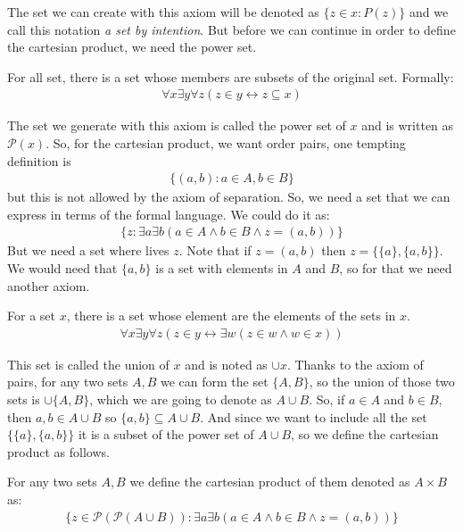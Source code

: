 \documentclass{tufte-handout}
\begin{document}
The set we can create with this axiom will be denoted as $\{z \in x: P(z)\}$ and we call this notation \textit{a set by intention}. But before we can continue in order to define the cartesian product, we need the power set.

\begin{axiom}
	For all set, there is a set whose members are subsets of the original set. Formally:
	\begin{align*}
		\forall x \exists y \forall z(z \in y \leftrightarrow z \subseteq x)
	\end{align*}
\end{axiom}

The set we generate with this axiom is called the power set of $x$ and is written as $\mathcal{P}(x)$. So, for the cartesian product, we want order pairs, one tempting definition is
\begin{align*}
	\{(a, b): a \in A, b \in B\}
\end{align*}
but this is not allowed by the axiom of separation. So, we need a set that we can express in terms of the formal language. We could do it as:
\begin{align*}
	\{z: \exists a \exists b(a \in A \wedge b \in B \wedge z = (a, b))\}
\end{align*}
But we need a set where lives $z$. Note that if $z = (a, b)$ then $z = \{\{a\}, \{a, b\}\}$. We would need that $\{a, b\}$ is a set with elements in $A$ and $B$, so for that we need another axiom.

\begin{axiom}
	For a set $x$, there is a set whose element are the elements of the sets in $x$.
	\begin{align*}
		\forall x \exists y \forall z(z \in y \leftrightarrow \exists w(z \in w \wedge w \in x))
	\end{align*}
\end{axiom}

This set is called the union of $x$ and is noted as $\cup x$. Thanks to the axiom of pairs, for any two sets $A, B$ we can form the set $\{A, B\}$, so the union of those two sets is $\cup \{A, B\}$, which we are going to denote as $A \cup B$. So, if $a \in A$ and $b \in B$, then  $a, b \in A \cup B$ so $\{a, b\} \subseteq A \cup B$. And since we want to include all the set $\{\{a\}, \{a, b\}\}$ it is a subset of the power set of $A \cup B$, so we define the cartesian product as follows.

\begin{definition}
	For any two sets $A, B$ we define the cartesian product of them denoted as $A \times B$ as:
	\begin{align*}
		\{z \in \mathcal{P}(\mathcal{P}(A \cup B)): \exists a \exists b(a \in A \wedge b \in B \wedge z = (a, b))\}
	\end{align*}
\end{definition}
\end{document}
